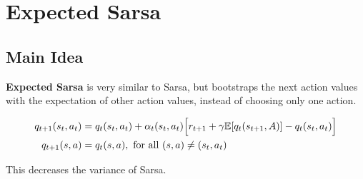 \section{Expected Sarsa} \label{sec:ExpectedSarsa}
    \subsection{Main Idea}    
        \textbf{Expected Sarsa} is very similar to Sarsa, but bootstraps the
        next action values with the expectation of other action values, instead of choosing only one action.

        \begin{align}
            q_{t+1}(s_t,a_t) &= q_t(s_t,a_t) + \alpha_t(s_t,a_t)\Big[ r_{t+1} + \gamma \mathbb{E}[q_t(s_{t+1}, A)] - q_t(s_t,a_t) \Big] \label{eq:ExpectedSarsaUpdate}\\
            q_{t+1}(s,a) &= q_t(s,a), \text{ for all } (s,a) \neq (s_t,a_t)
        \end{align}

        This decreases the variance of Sarsa.

        